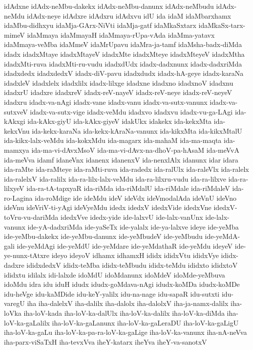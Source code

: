 {idAdxne
idAdx-neMbu-dakekx
idAdx-neMbu-danunx
idAdx-neMbudu
idAdx-neMdu
idAdx-neye
idAdxre
idAdxru
idAdxvu
idU
ida
idaM
idaMbarxhamx
idaMbu-didhxyu
idaMja-GArx-NiVti
idaMja-gatf
idaMkaSxtarx
idaMkaSx-tarx-mimeV
idaMmaya
idaMmayaH
idaMmaya-rUpa-vAda
idaMma-yatavx
idaMmaya-veMba
idaMmeV
idaMrUpavu
idaMra-ja-tamf
idaMsha-badx-diMda
idadx
idadxMtaye
idadxMtayeV
idadxMte
idadxMteye
idadxMteyeV
idadxMtha
idadxMti-ruva
idadxMti-ru-vudu
idadxdUdx
idadx-dadxnunx
idadx-dadxriMda
idadxdedx
idadxdedxV
idadx-diV-pavu
idadxdudx
idadx-hA-geye
idadx-karaNa
idadxleV
idadxlelx
idadxlilx
idadx-lilxge
idadxne
idadxno
idadxnoV
idadxnu
idadxrU
idadxre
idadxreV
idadx-reV-nayeV
idadx-reV-neye
idadx-reV-neyeV
idadxru
idadx-va-nAgi
idadx-vane
idadx-vanu
idadx-va-sutx-vanunx
idadx-va-sutxveV
idadx-va-sutx-vige
idadx-veMdu
idadxvo
idadxvu
idadx-vu-ga-LAgi
ida-kAkxgi
ida-kAkx-giyU
ida-kAkx-giyeV
idakUkx
idakekx
ida-kekxMta
ida-kekxVnu
ida-kekx-karaNa
ida-kekx-kAraNa-vanunx
ida-kikxMta
ida-kikxMtalU
ida-kikx-lalx-veMdu
ida-kokxMdu
ida-magarx
ida-mahaM
ida-ma-maqta
ida-mamxya
ida-ma-vi-dAvxMsoV
ida-ma-vi-dAvx-na-dhoV-pa-hAsaM
ida-meVvA
ida-meVva
idamf
idaneVnx
idanenx
idanenxV
ida-nenxlAlx
idanunx
idar
idara
ida-raMte
ida-raMteye
ida-raMti-ruva
ida-radedx
ida-ralUlx
ida-raleVlx
ida-ralelx
ida-ralelxV
ida-ralilx
ida-ra-lilx-lalx-veMdu
ida-ra-lilxru-vudu
ida-ra-lilxve
ida-ra-lilxyeV
ida-ra-tA-tapxyaR
ida-riMda
ida-riMdalU
ida-riMdale
ida-riMdaleV
ida-ro-Lagina
ida-roMdige
ide
ideMdu
ideV
ideVdx
ideVmodalAda
ideVnU
ideVno
ideVnu
ideVriV-ti-yAgi
ideVyeMdu
idedx
idedxV
idedxVide
idedxVne
idedxV-toVru-vu-dariMda
idedxVve
idedx-yide
ide-lalxvU
ide-lalx-vanUnx
ide-lalx-vanunx
ide-yA-dadxriMda
ide-yaSeTx
ide-yalalx
ide-ya-lalxve
ideye
ide-yeMba
ide-yeMbu-dakekx
ide-yeMbu-danunx
ide-yeMbudeV
ide-yeMbudu
ide-yeMdA-gali
ide-yeMdAgi
ide-yeMdU
ide-yeMdare
ide-yeMdathaR
ide-yeMdu
ideyeV
ide-ye-nunx-tAtxre
ideyo
ideyoV
idhamx
idhamxH
ididx
ididxVtu
ididxVye
ididx-dadxre
ididxdedxV
ididx-teMba
ididx-teMbudu
ididx-teMdu
ididxto
ididxtoV
ididxtu
idilalx
idi-lalxde
idoMdU
idoMdanunx
idoMdeV
idoMde-yeMbuva
idoMdu
idra
idu
iduH
idudx
idudx-goMdava-nAgi
idudx-koMDa
idudx-koMDe
idu-heVge
idu-kaMDide
idu-keY-yalilx
idu-na-nage
idu-sapaR
idu-sutxti
idu-varegU
iha
iha-dalelxV
iha-dalilx
iha-dalolx
iha-dalolxV
iha-ja-namx-dalilx
iha-loVka
iha-loV-kada
iha-loV-ka-dalUlx
iha-loV-ka-dalilx
iha-loV-ka-diMda
iha-loV-ka-gaLalilx
iha-loV-ka-gaLanunx
iha-loV-ka-gaLeraDU
iha-loV-ka-gaLigU
iha-loV-ka-gaLu
iha-loV-ka-pa-ra-loV-ka-gaLige
iha-loV-ka-vanunx
iha-nA-neVva
iha-parx-viSaTxH
iha-tevxVva
iheY-katarx
iheYva
iheY-va-sanotxV
}
